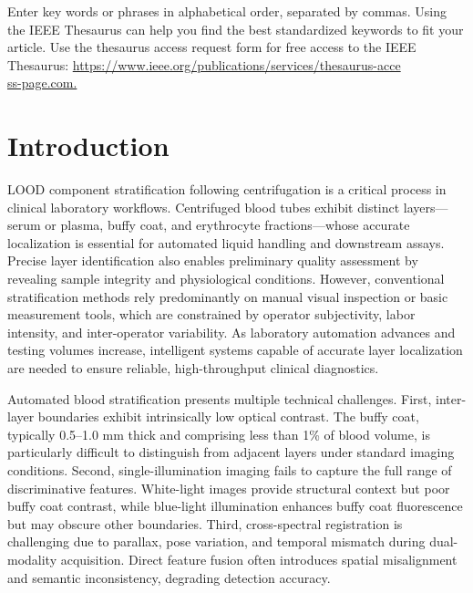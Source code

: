 \documentclass[journal,twoside,web]{ieeecolor}
\begin{document}
\begin{IEEEkeywords}
Enter key words or phrases in alphabetical order, separated by commas. Using the IEEE Thesaurus can help you find the best standardized keywords to fit your article. Use the thesaurus access request form for free access to the IEEE Thesaurus: \underline{https://www.ieee.org/publications/services/thesaurus-acce}\\
\underline{ss-page.com.}
\end{IEEEkeywords}

\section{Introduction}
\label{sec:introduction}
LOOD component stratification following centrifugation is a critical process in clinical laboratory workflows. Centrifuged blood tubes exhibit distinct layers—serum or plasma, buffy coat, and erythrocyte fractions—whose accurate localization is essential for automated liquid handling and downstream assays. Precise layer identification also enables preliminary quality assessment by revealing sample integrity and physiological conditions. However, conventional stratification methods rely predominantly on manual visual inspection or basic measurement tools, which are constrained by operator subjectivity, labor intensity, and inter-operator variability. As laboratory automation advances and testing volumes increase, intelligent systems capable of accurate layer localization are needed to ensure reliable, high-throughput clinical diagnostics.

Automated blood stratification presents multiple technical challenges. First, inter-layer boundaries exhibit intrinsically low optical contrast. The buffy coat, typically 0.5–1.0 mm thick and comprising less than 1\% of blood volume, is particularly difficult to distinguish from adjacent layers under standard imaging conditions. Second, single-illumination imaging fails to capture the full range of discriminative features. White-light images provide structural context but poor buffy coat contrast, while blue-light illumination enhances buffy coat fluorescence but may obscure other boundaries. Third, cross-spectral registration is challenging due to parallax, pose variation, and temporal mismatch during dual-modality acquisition. Direct feature fusion often introduces spatial misalignment and semantic inconsistency, degrading detection accuracy.
\end{document}
